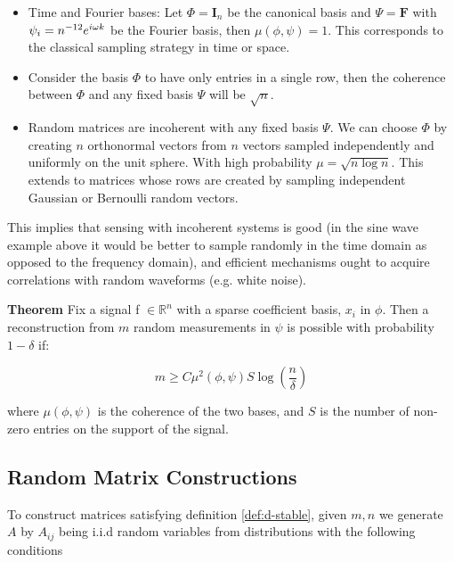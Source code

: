 \documentclass[12pt]{report}
\begin{document}
\begin{itemize}
\item Time and Fourier bases: Let \(\Phi = \textbf{I}_n\) be the canonical basis and \(\Psi = \textbf{F}\) with \(\psi_i = n^{-1\\2}e^{i\omega k} \) be the Fourier basis, then \(\mu\left(\phi, \psi\right) = 1\). This corresponds to the classical sampling strategy in time or space.
\item Consider the basis \(\Phi\) to have only entries in a single row, then the coherence between \(\Phi\) and any fixed basis \(\Psi\) will be \(\sqrt{n}\).
\item Random matrices are incoherent with any fixed basis \(\Psi\). We can choose \(\Phi\) by creating \(n\) orthonormal vectors from \(n\) vectors sampled independently and uniformly on the unit sphere. With high probability \(\mu = \sqrt{n\log{n}}\). This extends to matrices whose rows are created by sampling independent Gaussian or Bernoulli random vectors.
\end{itemize}

This implies that sensing with incoherent systems is good (in the sine wave example above it would be better to sample randomly in the time domain as opposed to the frequency domain), and efficient mechanisms ought to acquire correlations with random waveforms (e.g. white noise).

\textbf{Theorem} \cite{Candes2006}
Fix a signal f \(\in \mathbb{R}^n\) with a sparse coefficient basis, \(x_{i}\) in \(\phi\). Then a reconstruction from \(m\) random measurements in \(\psi\) is possible with probability \(1 - \delta\) if: 

\begin{equation}
m \geq C \mu^2(\phi, \psi) S \log\left(\frac{n}{\delta}\right)
\end{equation}
\label{minsamples}

where \( \mu(\phi, \psi)\) is the coherence of the two bases, and \(S\) is the number of non-zero entries on the support of the signal.

\subsection{Random Matrix Constructions} \label{sec:mtx-contruction}

To construct matrices satisfying definition \ref{def:d-stable}, given \(m, n\) we generate \(A\) by \(A_{ij}\) being i.i.d random variables from distributions with the following conditions \cite{davenport2010signal}
\end{document}
